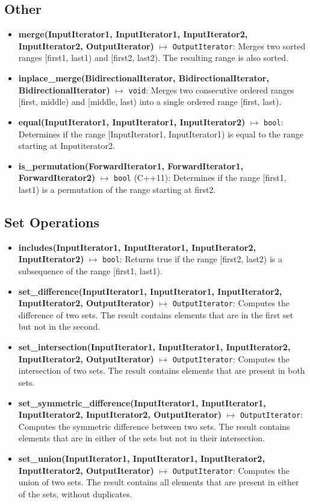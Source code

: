 \documentclass{report}
\begin{document}
    \subsection{Other}
    \begin{itemize}
        \item \textbf{merge(InputIterator1, InputIterator1, InputIterator2, InputIterator2, OutputIterator)} $\mapsto$ \texttt{OutputIterator}: Merges two sorted ranges [first1, last1) and [first2, last2). The resulting range is also sorted.
        \item \textbf{inplace\_merge(BidirectionalIterator, BidirectionalIterator, BidirectionalIterator)} $\mapsto$ \texttt{void}: Merges two consecutive ordered ranges [first, middle) and [middle, last) into a single ordered range [first, last).
        \item \textbf{equal(InputIterator1, InputIterator1, InputIterator2)} $\mapsto$ \texttt{bool}: Determines if the range [InputIterator1, InputIterator1) is equal to the range starting at Inputiterator2.
        \item \textbf{is\_permutation(ForwardIterator1, ForwardIterator1, ForwardIterator2)} $\mapsto$ \texttt{bool} (C++11): Determines if the range [first1, last1) is a permutation of the range starting at first2.
    \end{itemize}

    \bigbreak \noindent 
    \subsection{Set Operations}
    \begin{itemize}
        \item \textbf{includes(InputIterator1, InputIterator1, InputIterator2, InputIterator2)} $\mapsto$ \texttt{bool}: Returns true if the range [first2, last2) is a subsequence of the range [first1, last1).
        \item \textbf{set\_difference(InputIterator1, InputIterator1, InputIterator2, InputIterator2, OutputIterator)} $\mapsto$ \texttt{OutputIterator}: Computes the difference of two sets. The result contains elements that are in the first set but not in the second.
        \item \textbf{set\_intersection(InputIterator1, InputIterator1, InputIterator2, InputIterator2, OutputIterator)} $\mapsto$ \texttt{OutputIterator}: Computes the intersection of two sets. The result contains elements that are present in both sets.
        \item \textbf{set\_symmetric\_difference(InputIterator1, InputIterator1, InputIterator2, InputIterator2, OutputIterator)} $\mapsto$ \texttt{OutputIterator}: Computes the symmetric difference between two sets. The result contains elements that are in either of the sets but not in their intersection.
        \item \textbf{set\_union(InputIterator1, InputIterator1, InputIterator2, InputIterator2, OutputIterator)} $\mapsto$ \texttt{OutputIterator}: Computes the union of two sets. The result contains all elements that are present in either of the sets, without duplicates.
    \end{itemize}
\end{document}
